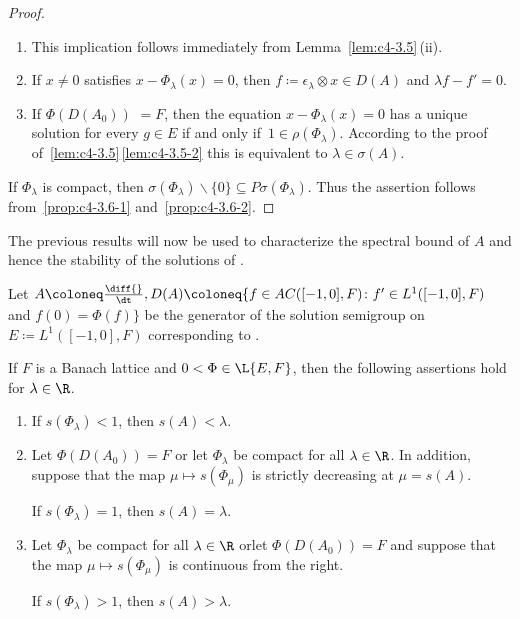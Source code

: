\begin{proof}
\begin{enumerate}[\upshape (i), wide, labelindent=.25em] 
\item 
This implication follows immediately from Lemma~\ref{lem:c4-3.5}\,(ii).

\item 
If\/ $x \neq 0$ satisfies $x - \Phi_{\lambda}(x) = 0$, then $f \coloneq  \epsilon_{\lambda} \otimes x \in D(A)$ and $\lambda f - f' = 0$.

\item 
If\/ $\Phi(D(A_{0}))$ $= F$,  then the equation $x - \Phi_{\lambda}(x) = 0$ has a
unique solution for every $g \in E$ if and only if\, $1 \in \rho(\Phi_{\lambda})$. 
According to the proof of~\ref{lem:c4-3.5}\,\ref{lem:c4-3.5-2} this is equivalent to $\lambda \in \sigma(A)$.
\end{enumerate}
If\/ $\Phi_{\lambda}$ is compact, then $\sigma(\Phi_{\lambda})\backslash\{0\} \subseteq P\sigma(\Phi_{\lambda})$. Thus the assertion follows from~\ref{prop:c4-3.6-1} and~\ref{prop:c4-3.6-2}.
\end{proof}
The previous results will now be used to characterize the spectral bound of\/ $A$ and hence the stability of the solutions of .
\begin{theorem}\label{thm:c4-3.7}
Let $A \coloneq \frac{\diff{}}{\dt}, D(A) \coloneq \{f \in AC([-1,0],F) \colon f' \in L^{1}([-1,0],F)$ and $f(0) = \Phi(f)\}$ be the generator of the solution semigroup on $E \coloneq L^{1}([-1,0],F)$ corresponding to . 

If\/ $F$ is a Banach lattice and $0 < \Phi \in \L{E,F}$, then the following assertions hold for $\lambda \in \R$.
\begin{enumerate}[\upshape (i)]
\item \label{thm:c4-3.7-1}
If\/ $s(\Phi_{\lambda}) < 1$, then $s(A) < \lambda$.
\item \label{thm:c4-3.7-2}
Let $\Phi(D(A_{0})) = F$ or let $\Phi_{\lambda}$ be compact for all $\lambda \in \R$. 
In addition, suppose that the map $\mu \mapsto s(\Phi_\mu)$ is strictly decreasing at $\mu = s(A)$. 

If\/ $s(\Phi_{\lambda}) = 1$, then $s(A) = \lambda$.
\item \label{thm:c4-3.7-3}
Let $\Phi_{\lambda}$ be compact for all $\lambda \in \R$ \quad or\quad let $\Phi(D(A_{0})) = F$ and suppose that the map $\mu \mapsto s(\Phi_\mu)$ is continuous from the right. 

If\/ $s(\Phi_{\lambda}) > 1$, then $s(A) > \lambda$.
\end{enumerate}
\end{theorem}
